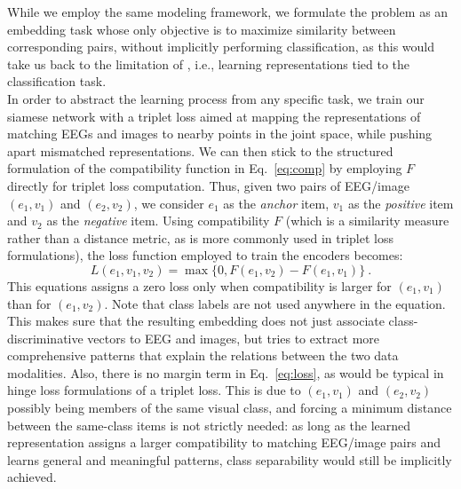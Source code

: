 \documentclass[10pt,journal,compsoc,twocolumn]{IEEEtran}
\begin{document}
While we employ the same modeling framework, we formulate the problem as an embedding task whose only objective is to maximize similarity between corresponding pairs, without implicitly performing classification, as this would take us back to the limitation of \cite{Spampinato2016deep}, i.e., learning representations tied to the classification task.\\
In order to abstract the learning process from any specific task, we train our siamese network with a triplet loss aimed at mapping the representations of matching EEGs and images to nearby points in the joint space, while pushing apart mismatched representations. We can then stick to the structured formulation of the compatibility function in Eq.~\ref{eq:comp} by employing $F$ directly for triplet loss computation. Thus, given two pairs of EEG/image $(e_1, v_1)$ and $(e_2, v_2)$, we consider $e_1$ as the \emph{anchor} item, $v_1$ as the \emph{positive} item and $v_2$ as the \emph{negative} item. Using compatibility $F$ (which is a similarity measure rather than a distance metric, as is more commonly used in triplet loss formulations), the loss function employed to train the encoders becomes:
\begin{equation}
 L(e_1, v_1, v_2) = \max \{ 0, F(e_1, v_2) - F(e_1, v_1) \}~.
 \label{eq:loss}
\end{equation}
This equations assigns a zero loss only when compatibility is larger for $(e_1,v_1)$ than for $(e_1,v_2)$. Note that class labels are not used anywhere in the equation. This makes sure that the resulting embedding does not just associate class-discriminative vectors to EEG and images, but tries to extract more comprehensive patterns that explain the relations between the two data modalities. Also, there is no margin term in Eq.~\ref{eq:loss}, as would be typical in hinge loss formulations of a triplet loss. This is due to $(e_1,v_1)$ and $(e_2,v_2)$ possibly being members of the same visual class, and forcing a minimum distance between the same-class items is not strictly needed: as long as the learned representation assigns a larger compatibility to matching EEG/image pairs and learns general and meaningful patterns, class separability would still be implicitly achieved.
\end{document}
